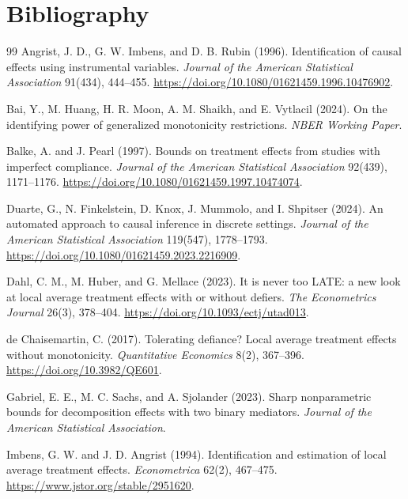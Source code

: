 \documentclass[11pt]{article}
\theoremstyle{definition}
\theoremstyle{plain}
\theoremstyle{remark}
\begin{document}
\section*{Bibliography}
\begin{thebibliography}{99}
Angrist, J. D., G. W. Imbens, and D. B. Rubin (1996).
Identification of causal effects using instrumental variables.
\emph{Journal of the American Statistical Association} 91(434), 444--455.
\url{https://doi.org/10.1080/01621459.1996.10476902}.

Bai, Y., M. Huang, H. R. Moon, A. M. Shaikh, and E. Vytlacil (2024).
On the identifying power of generalized monotonicity restrictions.
\emph{NBER Working Paper}.

Balke, A. and J. Pearl (1997).
Bounds on treatment effects from studies with imperfect compliance.
\emph{Journal of the American Statistical Association} 92(439), 1171--1176.
\url{https://doi.org/10.1080/01621459.1997.10474074}.

Duarte, G., N. Finkelstein, D. Knox, J. Mummolo, and I. Shpitser (2024).
An automated approach to causal inference in discrete settings.
\emph{Journal of the American Statistical Association} 119(547), 1778--1793.
\url{https://doi.org/10.1080/01621459.2023.2216909}.

Dahl, C. M., M. Huber, and G. Mellace (2023).
It is never too LATE: a new look at local average treatment effects with or
without defiers.
\emph{The Econometrics Journal} 26(3), 378--404.
\url{https://doi.org/10.1093/ectj/utad013}.

de Chaisemartin, C. (2017).
Tolerating defiance? Local average treatment effects without monotonicity.
\emph{Quantitative Economics} 8(2), 367--396.
\url{https://doi.org/10.3982/QE601}.

Gabriel, E. E., M. C. Sachs, and A. Sjolander (2023).
Sharp nonparametric bounds for decomposition effects with two binary mediators.
\emph{Journal of the American Statistical Association}.

Imbens, G. W. and J. D. Angrist (1994).
Identification and estimation of local average treatment effects.
\emph{Econometrica} 62(2), 467--475.
\url{https://www.jstor.org/stable/2951620}.


\end{thebibliography}
\end{document}
